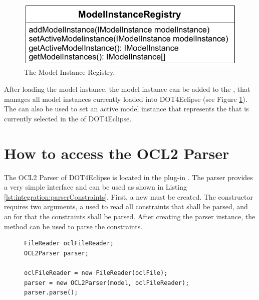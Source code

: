 \begin{figure}[!b]
	\centering
	\includegraphics[width=.75\linewidth]{figures/integration/modelInstanceRegistry}
	\caption{The Model Instance Registry.}
	\label{pic:integration:modelInstanceRegistry}
\end{figure}

After loading the model instance, the model instance can be added to the , that manages all model instances currently loaded into \acl{DOT4Eclipse} (see Figure \ref{pic:integration:modelInstanceRegistry}). The  can also be used to set an active model instance that represents the  that is currently selected in the  of \acl{DOT4Eclipse}.



\section{How to access the OCL2 Parser}

The \acs{OCL}2 Parser of \acl{DOT4Eclipse} is located in the plug-in . The parser provides a very simple interface and can be used as shown in Listing \ref{lst:integration:parserConstraints}. First, a new  must be created. The constructor requires two arguments, a  used to read all constraints that shall be parsed, and an  for that the constraints shall be parsed. After creating the parser instance, the method  can be used to parse the constraints.

\begin{figure}[!b]
\begin{lstlisting}[caption={How to parse constraints.}, captionpos=b, label=lst:integration:parserConstraints]
FileReader oclFileReader;
OCL2Parser parser;

oclFileReader = new FileReader(oclFile);
parser = new OCL2Parser(model, oclFileReader);	
parser.parse();
\end{lstlisting}
\end{figure}



